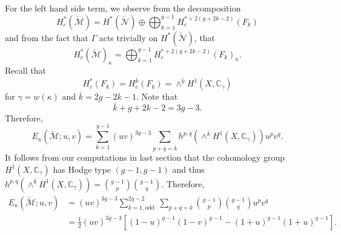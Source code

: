\documentclass[12pt,a4paper]{amsbook}
\theoremstyle{remark} \newtheorem{rmk}[thm]{Remark}
\theoremstyle{definition} \newtheorem{defn}[thm]{Definition}
\theoremstyle{definition} \newtheorem{ex}[thm]{Example}
\theoremstyle{definition} \newtheorem{ej}{Exercise}
\newcommand{\C}{\mathbb C}
\newcommand{\cM}{\mathcal M}
\newcommand{\cN}{\mathcal N}
\begin{document}
For the left hand side term, we observe from the decomposition
\begin{equation*}
H^*_c(\check{\cM}) = H^*(\check{\cN}) \oplus \bigoplus_{k=1}^{g-1} H_c^{*+ 2(g+2k-2)}(F_k)
\end{equation*}
and from the fact that $\Gamma$ acts trivially on $H^*(\check{\cN})$, that
\begin{equation*}
H^*_c(\check{\cM})_\kappa = \bigoplus_{k=1}^{g-1} H_c^{*+ 2(g+2k-2)}(F_k)_\kappa.
\end{equation*}
Recall that
\begin{equation*}
H_c^*(F_k)= H_c^{\bar{k}}(F_k) = \wedge^{\bar{k}} H^1(X,\C_\gamma)
\end{equation*}
for $\gamma=w(\kappa)$ and $\bar{k}=2g-2k-1$. Note that
\begin{equation*}
\bar{k} + g+2k-2 = 3g-3.
\end{equation*}
Therefore,
\begin{equation*}
E_\kappa(\check{\cM};u,v) = \sum_{k=1}^{g-1} (uv)^{3g-3} \sum_{p+q=\bar{k}} h^{p,q}(\wedge^{\bar{k}} H^1(X,\C_\gamma))u^p v^q.
\end{equation*}
It follows from our computations in last section that the cohomology group $H^1(X,\C_\gamma)$ has Hodge type $(g-1,g-1)$ and thus $h^{p,q}(\wedge^{\bar{k}} H^1(X,\C_\gamma))={g-1 \choose p}{g-1 \choose q}$. Therefore,
\begin{align*}
  E_\kappa(\check{\cM};u,v) &= (uv)^{3g-3} \sum_{\bar{k}=1,\text{odd}}^{2g-2} \ \sum_{p+q=\bar{k}} {g-1 \choose p}{g-1 \choose q} u^p v^q \\
  &= \tfrac{1}{2}(uv)^{3g-3}[(1-u)^{g-1}(1-v)^{g-1} - (1+u)^{g-1}(1+u)^{g-1}].
\end{align*}
\end{document}
